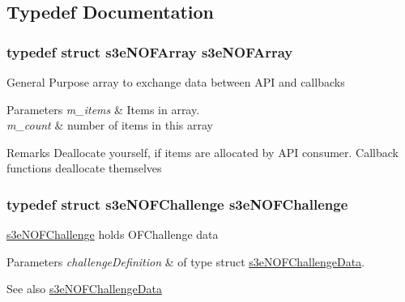 \subsection{Typedef Documentation}
\hypertarget{group___n_open_feint_api_group_gafc79d5fb8f1516cf5b6c61edb910d510}{
\subsubsection[{s3eNOFArray}]{\setlength{\rightskip}{0pt plus 5cm}typedef struct {\bf s3eNOFArray}  {\bf s3eNOFArray}}}
\label{group___n_open_feint_api_group_gafc79d5fb8f1516cf5b6c61edb910d510}
General Purpose array to exchange data between API and callbacks 
\begin{DoxyParams}{Parameters}
{\em m\_\-items} & Items in array. \\
\hline
{\em m\_\-count} & number of items in this array \\
\hline
\end{DoxyParams}
\begin{DoxyRemark}{Remarks}
Deallocate yourself, if items are allocated by API consumer. Callback functions deallocate themselves 
\end{DoxyRemark}
\hypertarget{group___n_open_feint_api_group_ga025bd1c28b0fb4dfedb98023c92caee8}{
\subsubsection[{s3eNOFChallenge}]{\setlength{\rightskip}{0pt plus 5cm}typedef struct {\bf s3eNOFChallenge}  {\bf s3eNOFChallenge}}}
\label{group___n_open_feint_api_group_ga025bd1c28b0fb4dfedb98023c92caee8}
\hyperlink{structs3e_n_o_f_challenge}{s3eNOFChallenge} holds OFChallenge data


\begin{DoxyParams}{Parameters}
{\em challengeDefinition} & of type struct \hyperlink{structs3e_n_o_f_challenge_data}{s3eNOFChallengeData}. \\
\hline
\end{DoxyParams}
\begin{DoxySeeAlso}{See also}
\hyperlink{structs3e_n_o_f_challenge_data}{s3eNOFChallengeData} 
\end{DoxySeeAlso}

